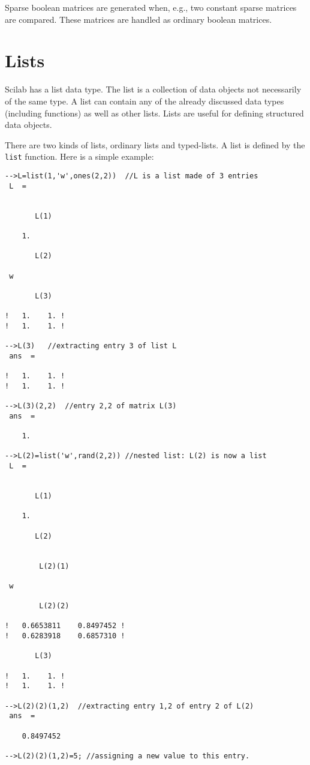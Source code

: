 Sparse boolean matrices are generated when, e.g., two constant sparse
matrices are compared. These matrices are handled as ordinary boolean
matrices.

\section{Lists}
\label{s2.5}

	Scilab has a list data type.  The list is a collection of data
objects not necessarily of the same type.  A list can contain any of
the already discussed data types (including functions) as well as
other lists.  Lists are useful for defining structured data objects.

There are two kinds of lists, ordinary lists and typed-lists.
A list is defined by the {\tt list} function. Here is a simple
example:

\begin{verbatim}
-->L=list(1,'w',ones(2,2))  //L is a list made of 3 entries
 L  =
 
 
       L(1)
 
    1.  
 
       L(2)
 
 w   
 
       L(3)
 
!   1.    1. !
!   1.    1. !

-->L(3)   //extracting entry 3 of list L
 ans  =
 
!   1.    1. !
!   1.    1. !

-->L(3)(2,2)  //entry 2,2 of matrix L(3)
 ans  =
 
    1.  

-->L(2)=list('w',rand(2,2)) //nested list: L(2) is now a list
 L  =
 
 
       L(1)
 
    1.  
 
       L(2)
 
 
        L(2)(1)
 
 w   
 
        L(2)(2)
 
!   0.6653811    0.8497452 !
!   0.6283918    0.6857310 !
 
       L(3)
 
!   1.    1. !
!   1.    1. !

-->L(2)(2)(1,2)  //extracting entry 1,2 of entry 2 of L(2)
 ans  =
 
    0.8497452  

-->L(2)(2)(1,2)=5; //assigning a new value to this entry.

\end{verbatim}

